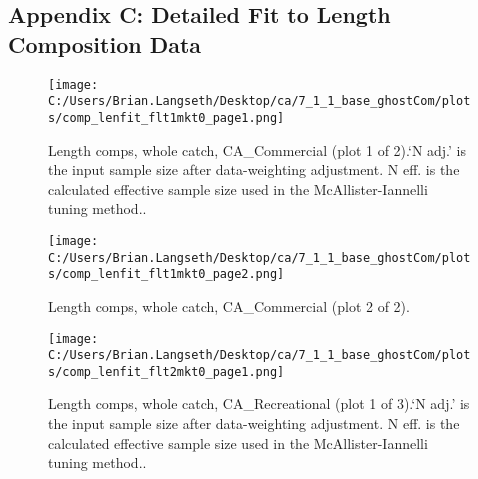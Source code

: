 \documentclass[11pt,
  english,
  a4paper,
]{article}
\begin{document}

\hypertarget{appendix-c-detailed-fit-to-length-composition-data}{%
\subsection{Appendix C: Detailed Fit to Length Composition Data}\label{appendix-c-detailed-fit-to-length-composition-data}}

\leavevmode\tagmcend\tagstructend


\begin{figure}
\centering
\texttt{[image: C:/Users/Brian.Langseth/Desktop/ca/7\_1\_1\_base\_ghostCom/plots/comp\_lenfit\_flt1mkt0\_page1.png]}
\caption{Length comps, whole catch, CA\_Commercial (plot 1 of 2).`N adj.' is the input sample size after data-weighting adjustment. N eff. is the calculated effective sample size used in the McAllister-Iannelli tuning method..\label{fig:comp_lenfit_flt1mkt0_page1}}
\end{figure}

\tagmcend\tagstructend


\begin{figure}
\centering
\texttt{[image: C:/Users/Brian.Langseth/Desktop/ca/7\_1\_1\_base\_ghostCom/plots/comp\_lenfit\_flt1mkt0\_page2.png]}
\caption{Length comps, whole catch, CA\_Commercial (plot 2 of 2).\label{fig:comp_lenfit_flt1mkt0_page2}}
\end{figure}

\tagmcend\tagstructend


\begin{figure}
\centering
\texttt{[image: C:/Users/Brian.Langseth/Desktop/ca/7\_1\_1\_base\_ghostCom/plots/comp\_lenfit\_flt2mkt0\_page1.png]}
\caption{Length comps, whole catch, CA\_Recreational (plot 1 of 3).`N adj.' is the input sample size after data-weighting adjustment. N eff. is the calculated effective sample size used in the McAllister-Iannelli tuning method..\label{fig:comp_lenfit_flt2mkt0_page1}}
\end{figure}
\end{document}

